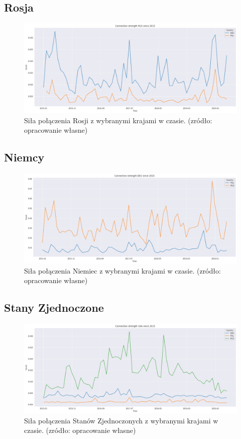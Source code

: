 \documentclass[11pt]{report}
\begin{document}
 \subsection{Rosja}
 
   	\begin{figure}[ht]
	\centering
	\includegraphics[width=0.8 \textwidth]{fig/RUS/RUSConnection.png}
	\caption{Siła połączenia Rosji z wybranymi krajami w czasie. (zródło: opracowanie własne)}
	\label{fig:RUSConnection}
	\end{figure}
 
 \subsection{Niemcy}
 
    \begin{figure}[ht]
	\centering
	\includegraphics[width=0.8 \textwidth]{fig/DEU/DEUConnection.png}
	\caption{Siła połączenia Niemiec z wybranymi krajami w czasie. (zródło: opracowanie własne)}
	\label{fig:DEUConnection}
	\end{figure}
	
 \subsection{Stany Zjednoczone}
 
    \begin{figure}[ht]
	\centering
	\includegraphics[width=0.8 \textwidth]{fig/USA/USAConnection.png}
	\caption{Siła połączenia Stanów Zjednoczonych z wybranymi krajami w czasie. (zródło: opracowanie własne)}
	\label{fig:USAConnection}
	\end{figure}
	
\end{document}
